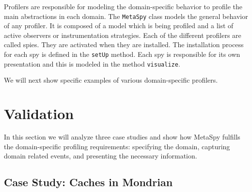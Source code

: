 \documentclass[runningheads]{llncs}
\newcommand{\project}{{\sc MetaSpy}\xspace}
\newcommand{\ct}{\lstinline[backgroundcolor=\color{white},basicstyle=\footnotesize\ttfamily]}
\newcommand{\seclabel}[1]{\label{sec:#1}}
\begin{document}
Profilers are responsible for modeling the domain-specific behavior to profile the main abstractions in each domain.
The \ct{MetaSpy} class models the general behavior of any profiler. It is composed of a model which is being profiled and a list of active observers or instrumentation strategies.
Each of the different profilers are called spies. They are activated when they are installed. The installation process for each spy is defined in the \ct{setUp} method.
Each spy is responsible for its own presentation and this is modeled in the method \ct{visualize}.

We will next show specific examples of various domain-specific profilers.


\section{Validation}\seclabel{validation}

In this section we will analyze three case studies and show how \project fulfills the domain-specific profiling requirements: specifying the domain, capturing domain related events, and presenting the necessary information.

\subsection{Case Study: Caches in Mondrian}
\end{document}
